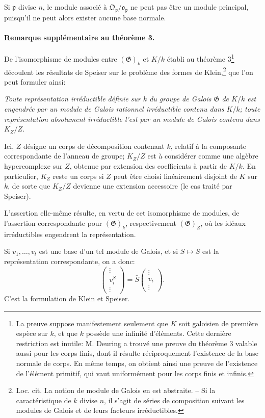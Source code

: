 Si \(\mathfrak{p}\) divise \(n\), le module associé à \(\mathfrak{O}_{\mathfrak{p}}/\mathfrak{o}_{\mathfrak{p}}\) ne peut pas être un module principal, puisqu'il ne peut alors exister aucune base normale.

\paragraph{Remarque supplémentaire au théorème 3.}
De l'isomorphisme de modules entre \((\mathfrak{G})_k\) et \(K/k\) établi au théorème 3\footnote{La preuve suppose manifestement seulement que \(K\) soit galoisien de première espèce sur \(k\), et que \(k\) possède une infinité d'éléments. Cette dernière restriction est inutile: M. Deuring a trouvé une preuve du théorème 3 valable aussi pour les corps finis, dont il résulte réciproquement l'existence de la base normale de corps. En même temps, on obtient ainsi une preuve de l'existence de l'élément primitif, qui vaut uniformément pour les corps finis et infinis.} découlent les résultats de Speiser sur le problème des formes de Klein,\footnote{Loc. cit. La notion de module de Galois en est abstraite. -- Si la caractéristique de \(k\) divise \(n\), il s'agit de séries de composition suivant les modules de Galois et de leurs facteurs irréductibles.} que l'on peut formuler ainsi:

\emph{Toute représentation irréductible définie sur \(k\) du groupe de Galois \(\mathfrak{G}\) de \(K/k\) est engendrée par un module de Galois rationnel irréductible contenu dans \(K/k\); toute représentation absolument irréductible l'est par un module de Galois contenu dans \(K_Z/Z\).}

Ici, \(Z\) désigne un corps de décomposition contenant \(k\), relatif à la composante correspondante de l'anneau de groupe; \(K_Z/Z\) est à considérer comme une algèbre hypercomplexe sur \(Z\), obtenue par extension des coefficients à partir de \(K/k\). En particulier, \(K_Z\) reste un corps si \(Z\) peut être choisi linéairement disjoint de \(K\) sur \(k\), de sorte que \(K_Z/Z\) devienne une extension accessoire (le cas traité par Speiser).

L'assertion elle-même résulte, en vertu de cet isomorphisme de modules, de l'assertion correspondante pour \((\mathfrak{G})_k\), respectivement \((\mathfrak{G})_Z\), où les idéaux irréductibles engendrent la représentation.

Si \(v_1,\ldots,v_t\) est une base d'un tel module de Galois, et si \(S\mapsto \bar S\) est la représentation correspondante, on a donc:
\[
        \begin{pmatrix}\vdots\\ v_i^S\\ \vdots\end{pmatrix}
        =\bar S\begin{pmatrix}\vdots\\ v_i\\ \vdots\end{pmatrix}.
\]
C'est la formulation de Klein et Speiser.

